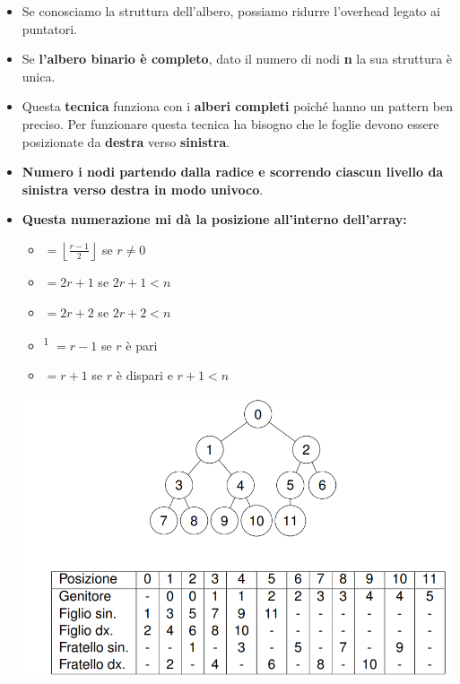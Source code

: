 \begin{itemize}
    \item  Se conosciamo la struttura dell’albero, possiamo ridurre
    l’overhead legato ai puntatori.
    
    \item Se \textbf{l’albero binario è completo}, dato il numero di nodi \textbf{n} la
    sua struttura è unica.

    \item Questa \textbf{tecnica} funziona con i \textbf{alberi completi} poiché hanno un pattern ben preciso. Per funzionare questa tecnica ha bisogno che le foglie devono essere posizionate da \textbf{destra} verso \textbf{sinistra}.
    
    \item \textbf{Numero i nodi partendo dalla radice e scorrendo ciascun
    livello da sinistra verso destra in modo univoco}.
    
    \item \textbf{Questa numerazione mi dà la posizione all’interno
    dell’array:}

    \begin{itemize}
        \item \textcolor{blue}{} $= \left\lfloor \frac{r - 1}{2} \right\rfloor$ se $r \neq 0$
        \item \textcolor{blue}{} $= 2r + 1$ se $2r + 1 < n$
        \item \textcolor{blue}{} $= 2r + 2$ se $2r + 2 < n$
        \item \textcolor{blue}{}\textsuperscript{1} $= r - 1$ se $r$ è pari
        \item \textcolor{blue}{} $= r + 1$ se $r$ è dispari e $r + 1 < n$
    \end{itemize}
    \begin{center}
        \includegraphics[scale = 0.6]{Capitoli/Alberi Binari/Esempi/AlberoFromArray.png}
    \end{center}
\end{itemize}
